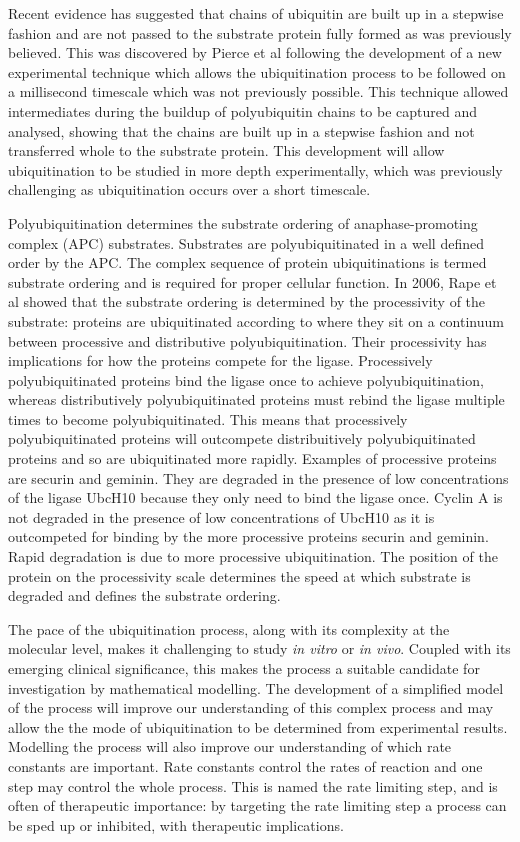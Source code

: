 \documentclass[11pt]{article}
\begin{document}
Recent evidence has suggested that chains of ubiquitin are built up in a stepwise fashion and are not passed to the substrate protein fully formed as was previously believed\cite{li2007ubiquitin}. This was discovered by Pierce et al\cite{pierce2009detection} following the development of a new experimental technique which allows the ubiquitination process to be followed on a millisecond timescale which was not previously possible. This technique allowed intermediates during the buildup of polyubiquitin chains to be captured and analysed, showing that the chains are built up in a stepwise fashion and not transferred whole to the substrate protein. This development will allow ubiquitination to be studied in more depth experimentally, which was previously challenging as ubiquitination occurs over a short timescale.

Polyubiquitination determines the substrate ordering of anaphase-promoting complex (APC) substrates. Substrates are polyubiquitinated in a well defined order by the APC. The complex sequence of protein ubiquitinations is termed substrate ordering and is required for proper cellular function. In 2006, Rape et al\cite{rape2006processivity} showed that the substrate ordering is determined by the processivity of the substrate: proteins are ubiquitinated according to where they sit on a continuum between processive and distributive polyubiquitination. Their processivity has implications for how the proteins compete for the ligase. Processively polyubiquitinated proteins bind the ligase once to achieve polyubiquitination, whereas distributively polyubiquitinated proteins must rebind the ligase multiple times to become polyubiquitinated. This means that processively polyubiquitinated proteins will outcompete distribuitively polyubiquitinated proteins and so are ubiquitinated more rapidly. Examples of processive proteins are securin and geminin. They are degraded in the presence of low concentrations of the ligase UbcH10 because they only need to bind the ligase once. Cyclin A is not degraded in the presence of low concentrations of UbcH10\cite{rape2004autonomous} as it is outcompeted for binding by the more processive proteins securin and geminin. Rapid degradation is due to more processive ubiquitination. The position of the protein on the processivity scale determines the speed at which substrate is degraded and defines the substrate ordering.

The pace of the ubiquitination process, along with its complexity at the molecular level, makes it challenging to study \emph{in vitro} or \emph{in vivo}. Coupled with its emerging clinical significance, this makes the process a suitable candidate for investigation by mathematical modelling. The development of a simplified model of the process will improve our understanding of this complex process and may allow the the mode of ubiquitination to be determined from experimental results. Modelling the process will also improve our understanding of which rate constants are important. Rate constants control the rates of reaction and one step may control the whole process. This is named the rate limiting step, and is often of therapeutic importance: by targeting the rate limiting step a process can be sped up or inhibited, with therapeutic implications. 
\end{document}
